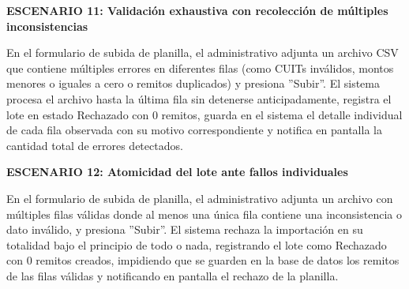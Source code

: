 \documentclass[a4paper,9pt]{article}
\begin{document}
\begin{tcolorbox}[hucard, title={\textbf{HU-2: IMPORTAR PLANILLA DE REMITOS} \hfill \scriptsize \colorbox{tealstatus}{\textbf{\ Accepted\ }} \quad \colorbox{white}{\textcolor{primarydark}{\textbf{\ 5 pts\ }}}}]
{\noindent\textbf{\textcolor{secondarydark}{ESCENARIO 11:  Validación exhaustiva con recolección de múltiples inconsistencias}}\par\vspace{1pt}
En el formulario de subida de planilla, el administrativo adjunta un archivo CSV que contiene múltiples errores en diferentes filas (como CUITs inválidos, montos menores o iguales a cero o remitos duplicados) y presiona ''Subir''. El sistema procesa el archivo hasta la última fila sin detenerse anticipadamente, registra el lote en estado Rechazado con 0 remitos, guarda en el sistema el detalle individual de cada fila observada con su motivo correspondiente y notifica en pantalla la cantidad total de errores detectados.\par\vspace{2.5pt}
\noindent\textbf{\textcolor{secondarydark}{ESCENARIO 12:  Atomicidad del lote ante fallos individuales}}\par\vspace{1pt}
En el formulario de subida de planilla, el administrativo adjunta un archivo con múltiples filas válidas donde al menos una única fila contiene una inconsistencia o dato inválido, y presiona ''Subir''. El sistema rechaza la importación en su totalidad bajo el principio de todo o nada, registrando el lote como Rechazado con 0 remitos creados, impidiendo que se guarden en la base de datos los remitos de las filas válidas y notificando en pantalla el rechazo de la planilla.\par\vspace{2.5pt}
}\par
\end{tcolorbox}
\end{document}
